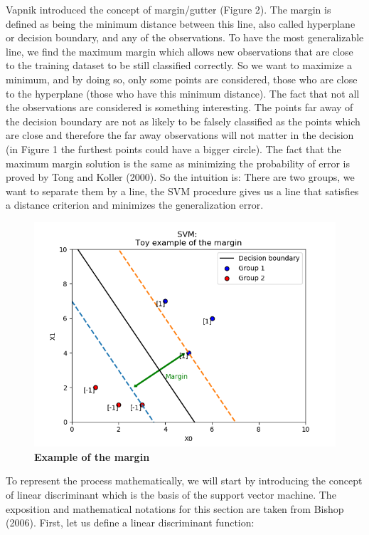 \documentclass[a4paper,12pt]{article}
\numberwithin{equation}{section}
\begin{document}
Vapnik introduced the concept of margin/gutter (Figure 2). The margin is defined as being the minimum distance between this line, also called hyperplane or decision boundary, and any of the observations. To have the most generalizable line, we find the maximum margin which allows new observations that are close to the training dataset to be still classified correctly. So we want to maximize a minimum, and by doing so, only some points are considered, those who are close to the hyperplane (those who have this minimum distance). The fact that not all the observations are considered is something interesting. The points far away of the decision boundary are not as likely to be falsely classified as the points which are close and therefore the far away observations will not matter in the decision (in Figure 1 the furthest points could have a bigger circle). The fact that the maximum margin solution is the same as minimizing the probability of error is proved by Tong and Koller (2000). So the intuition is: There are two groups, we want to separate them by a line, the SVM procedure gives us a line that satisfies a distance criterion and minimizes the generalization error.

\begin{figure}[H]%
    \begin{center}
    \includegraphics[scale = 0.7]{Figure4SVM.png}%
    \caption{\textbf{Example of the margin}}
    \label{fig2:example}%
    \end{center}
\end{figure}


To represent the process mathematically, we will start by introducing the concept of linear discriminant which is the basis of the support vector machine. The exposition and mathematical notations for this section are taken from Bishop (2006). First, let us define a linear discriminant function:
\end{document}
